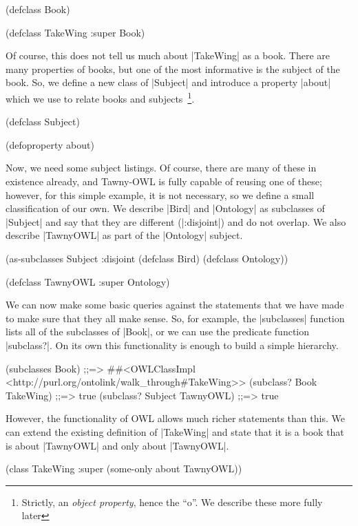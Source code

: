 \begin{tawny}
(defclass Book)

(defclass TakeWing
  :super Book)
\end{tawny}

Of course, this does not tell us much about |TakeWing| as a book. There are
many properties of books, but one of the most informative is the subject of
the book. So, we define a new class of |Subject| and introduce a property
|about| which we use to relate books and subjects~\footnote{Strictly, an
  \emph{object property}, hence the ``o''. We describe these more fully
  later}.

\begin{tawny}
(defclass Subject)

(defoproperty about)
\end{tawny}

Now, we need some subject listings. Of course, there are many of these in
existence already, and Tawny-OWL is fully capable of reusing one of these;
however, for this simple example, it is not necessary, so we define a small
classification of our own. We describe |Bird| and |Ontology| as subclasses of
|Subject| and say that they are different (|:disjoint|) and do not overlap. We
also describe |TawnyOWL| as part of the |Ontology| subject.

\begin{tawny}
(as-subclasses
 Subject
 :disjoint
 (defclass Bird)
 (defclass Ontology))

(defclass TawnyOWL
  :super Ontology)
\end{tawny}

We can now make some basic queries against the statements that we have made to
make sure that they all make sense. So, for example, the |subclasses| function
lists all of the subclasses of |Book|, or we can use the predicate function
|subclass?|. On its own this functionality is enough to build a simple
hierarchy.

\begin{tawny}
(subclasses Book)
;;=> #{#<OWLClassImpl <http://purl.org/ontolink/walk_through#TakeWing>>}
(subclass? Book TakeWing)
;;=> true
(subclass? Subject TawnyOWL)
;;=> true
\end{tawny}

However, the functionality of OWL allows much richer statements than this. We
can extend the existing definition of |TakeWing| and state that it is a book
that is about |TawnyOWL| and only about |TawnyOWL|.

\begin{tawny}
(class
 TakeWing
 :super
 (some-only about TawnyOWL))
\end{tawny}


